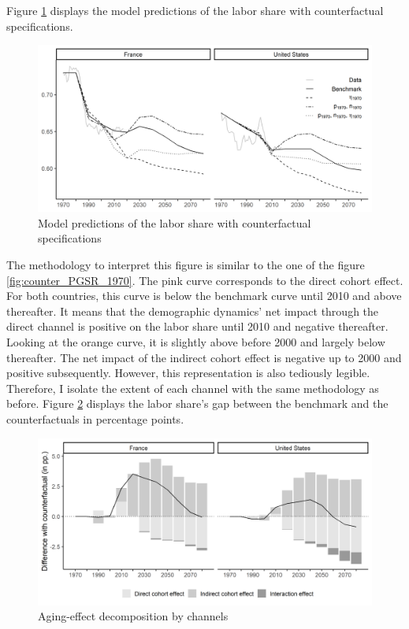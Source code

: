 Figure \ref{fig:counter_DEIE_1970} displays the model predictions of the labor share with counterfactual specifications.
\begin{figure}[tb]
	\centering
	\includegraphics[width=1\linewidth]{../result/decomposition/counter_DEIE.png}
	\caption{Model predictions of the labor share with counterfactual specifications}
	\label{fig:counter_DEIE_1970}
\end{figure}
The methodology to interpret this figure is similar to the one of the figure \ref{fig:counter_PGSR_1970}. The pink curve corresponds to the direct cohort effect. For both countries, this curve is below the benchmark curve until 2010 and above thereafter. It means that the demographic dynamics' net impact through the direct channel is positive on the labor share until 2010 and negative thereafter. Looking at the orange curve, it is slightly above before 2000 and largely below thereafter. The net impact of the indirect cohort effect is negative up to 2000 and positive subsequently. However, this representation is also tediously legible. Therefore, I isolate the extent of each channel with the same methodology as before. Figure \ref{fig:decomp_DEIE_1970} displays the labor share's gap between the benchmark and the counterfactuals in percentage points.
\begin{figure}[tb]
	\centering
	\includegraphics[width=1\linewidth]{../result/decomposition/decomp_DEIE.png}
	\caption{Aging-effect decomposition by channels}
	\label{fig:decomp_DEIE_1970}
\end{figure}
